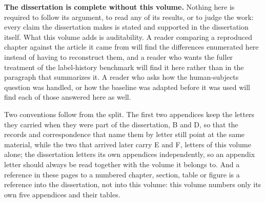 \documentclass[
    12pt,
    openright,
    oneside,
    a4paper,
    sumario=tradicional,
    brazil,
    english,
]{abntex2}
\begin{document}
    \textbf{The dissertation is complete without this volume.} Nothing here is required to
    follow its argument, to read any of its results, or to judge the work: every claim the
    dissertation makes is stated and supported in the dissertation itself. What this volume adds
    is auditability. A reader comparing a reproduced chapter against the article it came from
    will find the differences enumerated here instead of having to reconstruct them, and a
    reader who wants the fuller treatment of the label-history benchmark will find it here
    rather than in the paragraph that summarizes it. A reader who asks how the human-subjects
    question was handled, or how the baseline was adapted before it
    was used will find each of those answered here as well.

    Two conventions follow from the split. The first two appendices keep the letters they carried
    when they were part of the dissertation, B and D, so that the records and correspondence that
    name them by letter still point at the same material, while the two that arrived later carry
    E and F, letters of this volume alone; the dissertation letters its own appendices
    independently, so an appendix letter should always be read together with the volume it belongs
    to. And a reference in
    these pages to a numbered chapter, section, table or figure is a reference into the
    dissertation, not into this volume: this volume numbers only its own five appendices and
    their tables.

    \begin{apendicesenv}
        \partapendices
        \setcounter{chapter}{1}
        
        \setcounter{chapter}{3}
        
        \setcounter{chapter}{4}
        
        \setcounter{chapter}{5}
        
        \setcounter{chapter}{6}
        
    \end{apendicesenv}

    \postextual
    
\end{document}

